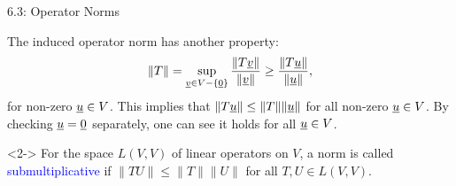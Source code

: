 \documentclass[10pt,letterpaper,english]{beamer}
\begin{document}
\begin{frame}{6.3: Operator Norms}



The induced operator norm has another property:
\[ \| T \| = \sup_{ \underline{v} \in V - \left\{ \underline{0} \right\} }
\frac{ \left\| T \underline{v} \right\| }{ \left\| \underline{v} \right\| } \geq \frac{ \left\| T \underline{u} \right\| }{ \left\| \underline{u} \right\| }, \]
for non-zero $\underline{u} \in V$.
This implies that $\| T \underline{u} \| \leq \| T \| \| \underline{u} \|$ for all non-zero $\underline{u}\in V$.
By checking $\underline{u}=\underline{0}$ separately, one can see it holds for all $\underline{u}\in V$.
\vspace{3mm}

\begin{definition}<2->
For the space $L(V,V)$ of linear operators on $V$, a norm is called \textcolor{blue}{submultiplicative} if $\| T U \| \leq \|T\| \|U\|$ for all $T,U \in L(V,V)$.
\end{definition}

\vspace{4mm}



\end{frame}
\end{document}
